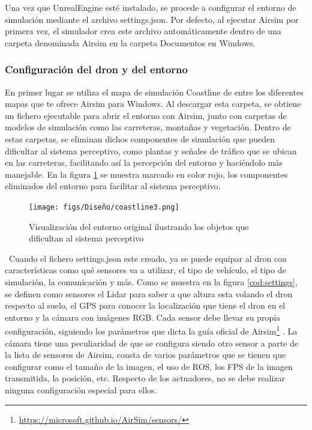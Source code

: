 Una vez que UnrealEngine esté instalado, se procede a configurar el entorno de simulación mediante el archivo settings.json. Por defecto, al ejecutar Airsim 
por primera vez, el simulador crea este archivo automáticamente dentro de una carpeta denominada Airsim en la carpeta Documentos en Windows. 


\subsubsection{Configuración del dron y del entorno}
\label{subsec:Configuración del dron y del entorno}

En primer lugar se utiliza el mapa de simulación Coastline de entre los diferentes mapas que te ofrece Airsim para Windows. Al descargar esta carpeta, 
se obtiene un fichero ejecutable para abrir el entorno con Airsim, junto con carpetas de modelos de simulación como las carreteras, montañas y vegetación. Dentro de estas carpetas, se eliminan dichos componentes 
de simulación que pueden dificultar al sistema perceptivo, como plantas y señales de tráfico que se ubican en las carreteras, facilitando así la percepción del entorno 
y haciéndolo más manejable. En la figura \ref{fig:CoastlineModificado} se muestra marcado en color rojo, los componentes eliminados del entorno para facilitar al sistema 
perceptivo.

\begin{figure} [H]
  \begin{center}
    \texttt{[image: figs/Diseño/coastline3.png]}
  \end{center}
  \caption{Visualización del entorno original ilustrando los objetos que dificultan al sistema perceptivo}
  \label{fig:CoastlineModificado}
\end{figure}\
Cuando el fichero settings.json este creado, ya se puede equipar al dron con características como qué sensores va a utilizar, 
el tipo de vehículo, el tipo de simulación, la comunicación y más. Como se muestra en la figura \ref{cod:settings}, se definen como sensores el Lidar para saber a que altura
esta volando el dron respecto al suelo, el GPS para conocer la localización que tiene el dron en el entorno y la cámara con imágenes
RGB. Cada sensor debe llevar su propia configuración, siguiendo los parámetros que dicta la guía oficial de Airsim\footnote{\url{https://microsoft.github.io/AirSim/sensors/}}
. La cámara tiene una peculiaridad de que se configura siendo otro sensor a parte de la lista de sensores de Airsim, consta de varios parámetros que se tienen que configurar como 
el tamaño de la imagen, el uso de ROS, los FPS de la imagen transmitida, la posición, etc. 
Respecto de los actuadores, no se debe realizar ninguna configuración especial para ellos.

